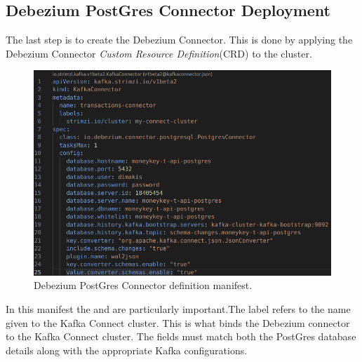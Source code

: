 \begin{flushleft}
    \subsection{Debezium PostGres Connector Deployment}
    The last step is to create the Debezium Connector. This is done by applying the Debezium Connector \emph{Custom Resource Definition}(CRD) to the cluster.
    \begin{figure} [ht]
        \begin{center}
            \includegraphics[width=1\textwidth]{figures/debezium-connector-manifest.png}
            \caption{Debezium PostGres Connector definition manifest.}
            \label{fig: 2.14}
        \end{center}
    \end{figure}
    \newline In this manifest the  and  are particularly important.\newline The  label refers to the name given to the Kafka Connect cluster.
    This is what binds the Debezium connector to the Kafka Connect cluster. \newline The  fields must match both the PostGres database details along
    with the appropriate Kafka configurations.

\end{flushleft}
